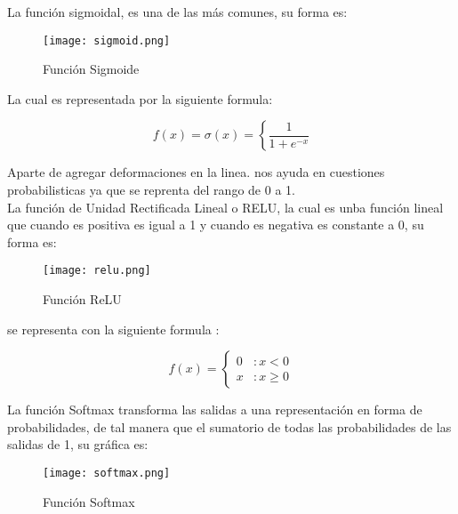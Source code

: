                 La funci\'on sigmoidal, es una de las m\'as comunes, su forma es: 

                \begin{figure}[H]
                    \centering
                    \texttt{[image: sigmoid.png]}
                    \caption{Funci\'on Sigmoide}
                    \label{fig:fig5}
                \end{figure}

                La cual es representada por la siguiente formula:

                \[f(x) = \sigma(x) =  \left\{ \frac{1}{1 + e^{-x}} \right. \]

                Aparte de agregar deformaciones en la linea. nos ayuda en 
                cuestiones probabilisticas ya que se reprenta del rango de 0 a 1. \\

                La funci\'on de Unidad Rectificada Lineal o RELU, la cual es unba funci\'on lineal
                que cuando es positiva es igual a 1 y cuando es negativa es constante a 0, su forma es: \label{subsec: relu}

                \begin{figure}[H]
                    \centering
                    \texttt{[image: relu.png]}
                    \caption{Funci\'on ReLU}
                    \label{fig:fig6}
                \end{figure}

                se representa con la siguiente formula \cite{Freire2021}: 

                \[f(x) = \left\{ \begin{array}{lr} 0 & : x < 0\\ x & : x \ge 0 \end{array} \right. \]

                La función Softmax transforma las salidas a una representación en forma de 
                probabilidades, de tal manera que el sumatorio de todas las probabilidades 
                de las salidas de 1, su gr\'afica es: \label{subsec: softmax}

                \begin{figure}[H]
                    \centering
                    \texttt{[image: softmax.png]}
                    \caption{Funci\'on Softmax}
                    \label{fig:fig7}
                \end{figure}


